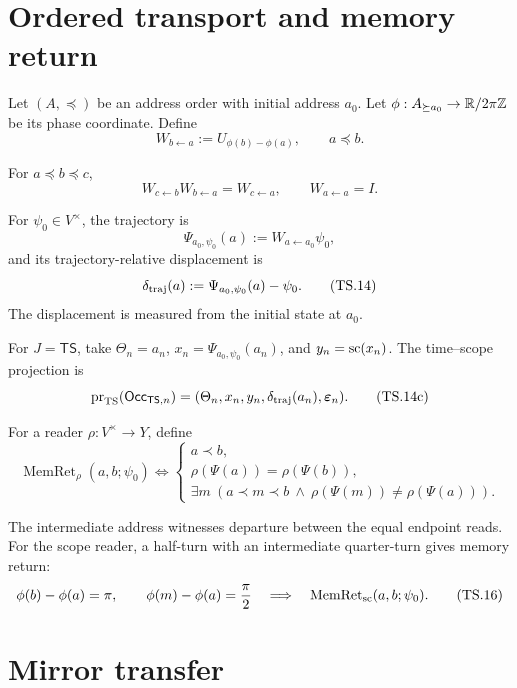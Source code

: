 \documentclass[10pt]{article}
\begin{document}
\section{Ordered transport and memory return}

Let $(A,\preceq)$ be an address order with initial address $a_0$.
Let $\phi:A_{\succeq a_0}\to\mathbb R/2\pi\mathbb Z$ be its phase coordinate. Define
\[
W_{b\leftarrow a}:=U_{\phi(b)-\phi(a)},
\qquad a\preceq b.
\tag{TS.11}
\]

\begin{proposition}
For $a\preceq b\preceq c$,
\[
W_{c\leftarrow b}W_{b\leftarrow a}=W_{c\leftarrow a},
\qquad W_{a\leftarrow a}=I.
\tag{TS.12}
\]
\end{proposition}

For $\psi_0\in V^\times$, the trajectory is
\[
\Psi_{a_0,\psi_0}(a):=W_{a\leftarrow a_0}\psi_0,
\tag{TS.13}
\]
and its trajectory-relative displacement is
\[
\delta_{\rm traj}(a):=\Psi_{a_0,\psi_0}(a)-\psi_0.
\tag{TS.14}
\]
The displacement is measured from the initial state at $a_0$.


For $J=\mathsf{TS}$, take $\Theta_n=a_n$,
$x_n=\Psi_{a_0,\psi_0}(a_n)$, and $y_n=\operatorname{sc}(x_n)$. The time--scope
projection is
\[
\operatorname{pr}_{\rm TS}(\mathsf{Occ}_{\mathsf{TS},n})
=(\Theta_n,x_n,y_n,\delta_{\rm traj}(a_n),
\boldsymbol\varepsilon_n).
\tag{TS.14c}
\]

\begin{definition}
For a reader $\rho:V^\times\to Y$, define
\[
\operatorname{MemRet}_{\rho}(a,b;\psi_0)
\Longleftrightarrow
\begin{cases}
a\prec b,\\
\rho(\Psi(a))=\rho(\Psi(b)),\\
\exists m\ (a\prec m\prec b\ \land\ \rho(\Psi(m))\ne\rho(\Psi(a))).
\end{cases}
\tag{TS.15}
\]
\end{definition}

The intermediate address witnesses departure between the equal endpoint reads.
For the scope reader, a half-turn with an intermediate quarter-turn gives
memory return:
\[
\phi(b)-\phi(a)=\pi,\qquad
\phi(m)-\phi(a)=\frac\pi2
\quad\Longrightarrow\quad
\operatorname{MemRet}_{\operatorname{sc}}(a,b;\psi_0).
\tag{TS.16}
\]

\section{Mirror transfer}
\end{document}
